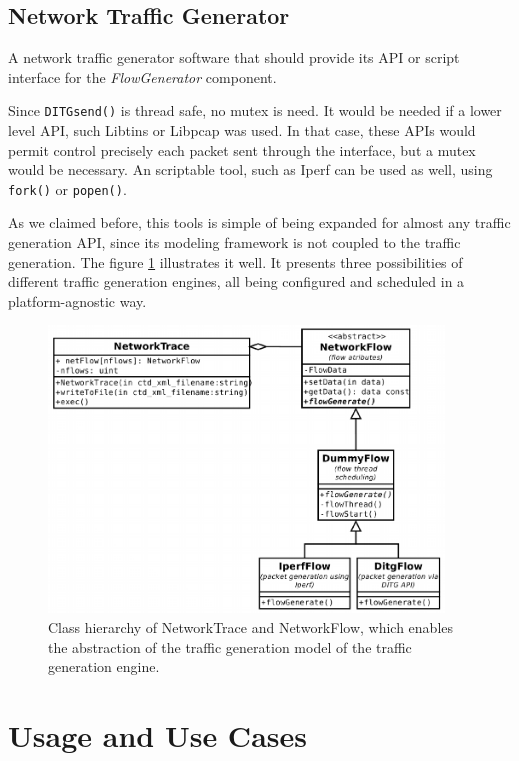 \subsection{Network Traffic Generator}


A network traffic generator software that should provide its API or script interface for the \textit{FlowGenerator} component. 
 
Since \texttt{DITGsend()} is thread safe, no mutex is need. It would be needed if a lower level API, such Libtins or Libpcap was used. In that case, these APIs would permit control precisely each packet sent through the interface, but a mutex would be necessary. An scriptable tool, such as Iperf can be used as well, using \texttt{fork()} or \texttt{popen()}.

As we claimed before, this tools is simple of being expanded for almost any traffic generation API, since its modeling framework is not coupled to the traffic generation.
The figure \ref{fig:network-trace-flow-class-diagram} illustrates it well. It presents three possibilities of different traffic generation engines, all being configured and scheduled in a platform-agnostic way.

\begin{figure}[ht!]
    \centering
    \includegraphics[height=3.0in]{figures/ch3/trace-flow}
    \caption{Class hierarchy of NetworkTrace and NetworkFlow, which enables the abstraction of the traffic generation model of the traffic generation engine.}
    \label{fig:network-trace-flow-class-diagram}
\end{figure}


\section{Usage and Use Cases}

